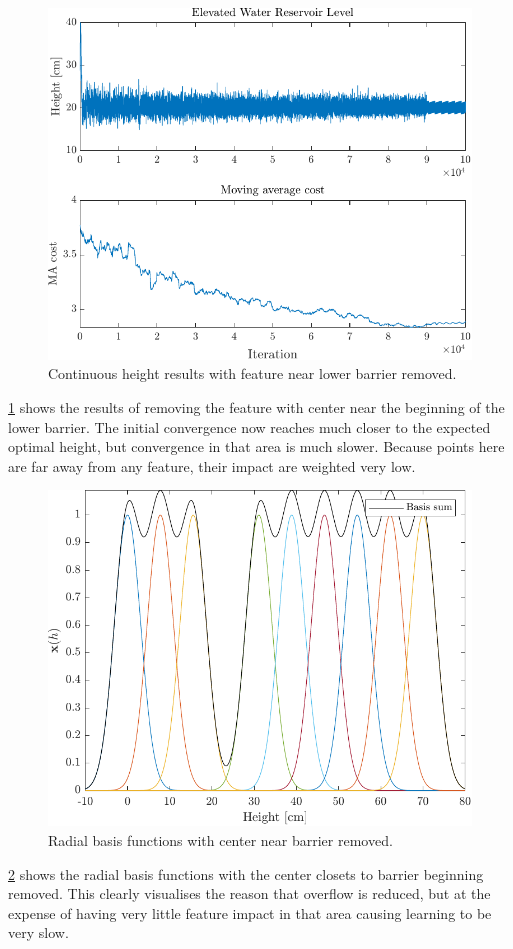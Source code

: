 \begin{figure}[h!]
	\centering
	\includegraphics[width=0.65\linewidth]{figures/RemovedCenter.pdf}
	\caption{Continuous height results with feature near lower barrier removed.}
	\label{fig:RemovedCenter}
\end{figure}

\cref{fig:RemovedCenter} shows the results of removing the feature with center near the beginning of the lower barrier. The initial convergence now reaches much closer to the expected optimal height, but convergence in that area is much slower. Because points here are far away from any feature, their impact are weighted very low.

\begin{figure}[h!]
	\centering
	\includegraphics[width=0.65\linewidth]{figures/RemovedRBF.pdf}
	\caption{Radial basis functions with center near barrier removed.}
	\label{fig:RemovedRBF}
\end{figure}

\cref{fig:RemovedRBF} shows the radial basis functions with the center closets to barrier beginning removed. This clearly visualises the reason that overflow is reduced, but at the expense of having very little feature impact in that area causing learning to be very slow.

